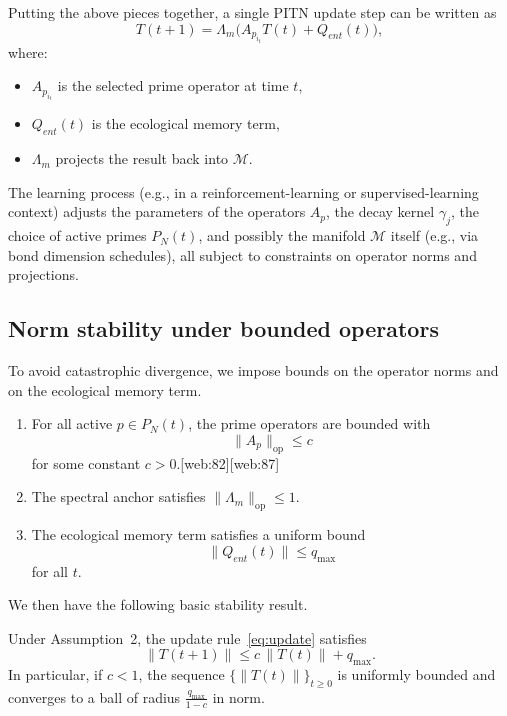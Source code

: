 \documentclass[11pt]{article}
\begin{document}
Putting the above pieces together, a single PITN update step can be written as
\begin{equation}
  T(t+1)
  =
  \Lambda_m\big(A_{p_{i_t}} T(t) + Q_{ent}(t)\big),
  \label{eq:update}
\end{equation}
where:
\begin{itemize}[leftmargin=*]
  \item \( A_{p_{i_t}} \) is the selected prime operator at time \( t \),
  \item \( Q_{ent}(t) \) is the ecological memory term,
  \item \( \Lambda_m \) projects the result back into \( \mathcal{M} \).
\end{itemize}

The learning process (e.g., in a reinforcement-learning or supervised-learning context) adjusts the parameters of the operators \( A_p \), the decay kernel \( \gamma_j \), the choice of active primes \( P_N(t) \), and possibly the manifold \( \mathcal{M} \) itself (e.g., via bond dimension schedules), all subject to constraints on operator norms and projections.

\subsection{Norm stability under bounded operators}

To avoid catastrophic divergence, we impose bounds on the operator norms and on the ecological memory term.

\begin{description}[leftmargin=2em]
\item[Assumption 2 (Operator and memory bounds).]
\begin{enumerate}[label=(\alph*), leftmargin=2.5em]
  \item For all active \( p \in P_N(t) \), the prime operators are bounded with
  \[
  \|A_p\|_{\mathrm{op}} \le c
  \]
  for some constant \( c > 0 \).[web:82][web:87]
  \item The spectral anchor satisfies \( \|\Lambda_m\|_{\mathrm{op}} \le 1 \).
  \item The ecological memory term satisfies a uniform bound
  \[
  \|Q_{ent}(t)\| \le q_{\max}
  \]
  for all \( t \).
\end{enumerate}
\end{description}

We then have the following basic stability result.

\begin{proposition}
\label{prop:norm-stability}
Under Assumption~2, the update rule~\eqref{eq:update} satisfies
\[
\|T(t+1)\| \le c\,\|T(t)\| + q_{\max}.
\]
In particular, if \( c < 1 \), the sequence \( \{\|T(t)\|\}_{t\ge 0} \) is uniformly bounded and converges to a ball of radius \( \frac{q_{\max}}{1-c} \) in norm.
\end{proposition}
\end{document}
